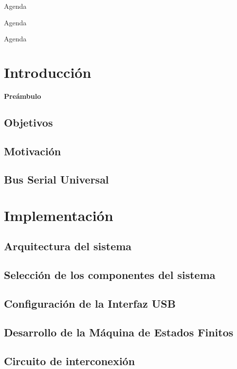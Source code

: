 \documentclass[11pt,a4paper,table]{beamer}
\begin{document}
	\titlepage
	\begin{frame}{Agenda}
		\tableofcontents[hideallsubsections]
	\end{frame}
	\begin{frame}{Agenda}
		\tableofcontents[sections={1,2}]
	\end{frame}
	\begin{frame}{Agenda}
		\tableofcontents[sections={3,4}]
	\end{frame}
	\section{Introducción}
		\framesubtitle{Preámbulo}
		\subsection{Objetivos}
			
		\subsection{Motivación}
			
		\subsection{Bus Serial Universal}
			
	\section{Implementación}
		\subsection{Arquitectura del sistema}
			
		\subsection{Selección de los componentes del sistema}
			
		\subsection{Configuración de la Interfaz USB}
			
		\subsection{Desarrollo de la Máquina de Estados Finitos}
			
		\subsection{Circuito de interconexión}
			
\end{document}
